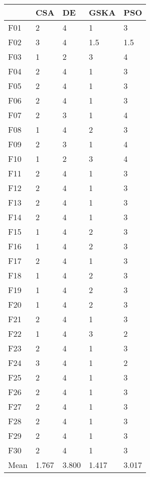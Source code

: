 \begin{tabular}{lllll}
\toprule
{} &    CSA &     DE &   GSKA &    PSO \\
\midrule
F01  &      2 &      4 &      1 &      3 \\
F02  &      3 &      4 &    1.5 &    1.5 \\
F03  &      1 &      2 &      3 &      4 \\
F04  &      2 &      4 &      1 &      3 \\
F05  &      2 &      4 &      1 &      3 \\
F06  &      2 &      4 &      1 &      3 \\
F07  &      2 &      3 &      1 &      4 \\
F08  &      1 &      4 &      2 &      3 \\
F09  &      2 &      3 &      1 &      4 \\
F10  &      1 &      2 &      3 &      4 \\
F11  &      2 &      4 &      1 &      3 \\
F12  &      2 &      4 &      1 &      3 \\
F13  &      2 &      4 &      1 &      3 \\
F14  &      2 &      4 &      1 &      3 \\
F15  &      1 &      4 &      2 &      3 \\
F16  &      1 &      4 &      2 &      3 \\
F17  &      2 &      4 &      1 &      3 \\
F18  &      1 &      4 &      2 &      3 \\
F19  &      1 &      4 &      2 &      3 \\
F20  &      1 &      4 &      2 &      3 \\
F21  &      2 &      4 &      1 &      3 \\
F22  &      1 &      4 &      3 &      2 \\
F23  &      2 &      4 &      1 &      3 \\
F24  &      3 &      4 &      1 &      2 \\
F25  &      2 &      4 &      1 &      3 \\
F26  &      2 &      4 &      1 &      3 \\
F27  &      2 &      4 &      1 &      3 \\
F28  &      2 &      4 &      1 &      3 \\
F29  &      2 &      4 &      1 &      3 \\
F30  &      2 &      4 &      1 &      3 \\
Mean &  1.767 &  3.800 &  1.417 &  3.017 \\
\bottomrule
\end{tabular}
